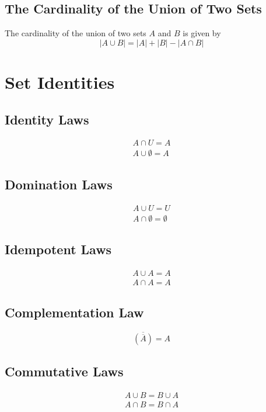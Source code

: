 \documentclass[12pt letter]{report}
\begin{document}
\subsection{The Cardinality of the Union of Two Sets}

The cardinality of the union of two sets $A$ and $B$ is given by
\[
  \left| A \cup B \right| = \left| A \right| + \left| B \right| - \left| A \cap B \right|
\]

\section{Set Identities}

\subsection{Identity Laws}

\begin{align*}
  A \cap   U = A \\
  A \cup  \emptyset = A
\end{align*}

\subsection{Domination Laws}

\begin{align*}
  A \cup U = U \\
  A \cap \emptyset = \emptyset
\end{align*}

\subsection{Idempotent Laws}

\begin{align*}
  A \cup A = A \\
  A \cap A = A
\end{align*}

\subsection{Complementation Law}
\[
  \overline{\left( \overline{A} \right) } = A
\]

\subsection{Commutative Laws}

\begin{align*}
  A \cup B = B \cup A \\
  A \cap B = B \cap A
\end{align*}
\end{document}
